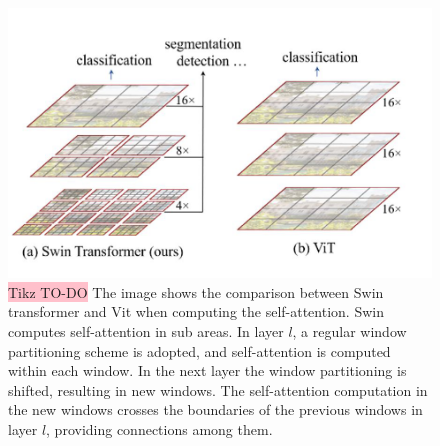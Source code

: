 \begin{figure}[!htbp]
    \centering
    \includegraphics[width=\linewidth]{tikz/Swin Transformer.png}
    \caption{{\color{red}\colorbox{pink}{Tikz TO-DO}} The image shows the comparison between Swin transformer and Vit when computing the self-attention. Swin computes self-attention in sub areas. In layer $l$, a regular window partitioning scheme is adopted, and self-attention is computed within each window. In the next layer the window partitioning is shifted, resulting in new windows. The self-attention computation in the new windows crosses the boundaries of the previous windows in layer $l$, providing connections among them.}
    \label{fig:Swin-transformer}
\end{figure}